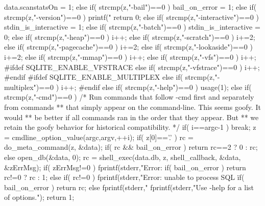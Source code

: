\begin{Codex}[label=shell.c,numbers=left]
{{{      data.scanstatsOn = 1;
    }else if( strcmp(z,"-bail")==0 ){
      bail_on_error = 1;
    }else if( strcmp(z,"-version")==0 ){
      printf("%
      return 0;
    }else if( strcmp(z,"-interactive")==0 ){
      stdin_is_interactive = 1;
    }else if( strcmp(z,"-batch")==0 ){
      stdin_is_interactive = 0;
    }else if( strcmp(z,"-heap")==0 ){
      i++;
    }else if( strcmp(z,"-scratch")==0 ){
      i+=2;
    }else if( strcmp(z,"-pagecache")==0 ){
      i+=2;
    }else if( strcmp(z,"-lookaside")==0 ){
      i+=2;
    }else if( strcmp(z,"-mmap")==0 ){
      i++;
    }else if( strcmp(z,"-vfs")==0 ){
      i++;
#ifdef SQLITE_ENABLE_VFSTRACE
    }else if( strcmp(z,"-vfstrace")==0 ){
      i++;
#endif
#ifdef SQLITE_ENABLE_MULTIPLEX
    }else if( strcmp(z,"-multiplex")==0 ){
      i++;
#endif
    }else if( strcmp(z,"-help")==0 ){
      usage(1);
    }else if( strcmp(z,"-cmd")==0 ){
      /* Run commands that follow -cmd first and separately from commands
      ** that simply appear on the command-line.  This seems goofy.  It would
      ** be better if all commands ran in the order that they appear.  But
      ** we retain the goofy behavior for historical compatibility. */
      if( i==argc-1 ) break;
      z = cmdline_option_value(argc,argv,++i);
      if( z[0]=='.' ){
        rc = do_meta_command(z, &data);
        if( rc && bail_on_error ) return rc==2 ? 0 : rc;
      }else{
        open_db(&data, 0);
        rc = shell_exec(data.db, z, shell_callback, &data, &zErrMsg);
        if( zErrMsg!=0 ){
          fprintf(stderr,"Error: %
          if( bail_on_error ) return rc!=0 ? rc : 1;
        }else if( rc!=0 ){
          fprintf(stderr,"Error: unable to process SQL \"%
          if( bail_on_error ) return rc;
        }
      }
    }else{
      fprintf(stderr,"%
      fprintf(stderr,"Use -help for a list of options.\n");
      return 1;
    }
  }

}
\end{Codex}
